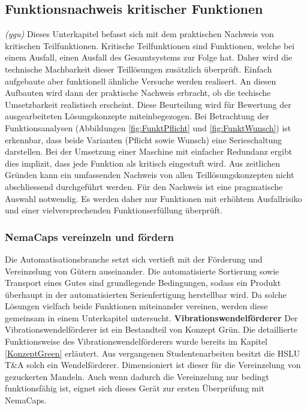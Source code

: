 \subsection{Funktionsnachweis kritischer Funktionen}
\label{funktionsnachweis}
\textit{(ygu)} Dieses Unterkapitel befasst sich mit dem praktischen Nachweis von kritischen Teilfunktionen. Kritische Teilfunktionen sind Funktionen, welche bei einem Ausfall, einen Ausfall des Gesamtsystems zur Folge hat. Daher wird die technische Machbarkeit dieser Teillösungen zusätzlich überprüft. Einfach aufgebaute aber funktionell ähnliche Versuche werden realisert. An diesen Aufbauten wird dann der praktische Nachweis erbracht, ob die techische Umsetzbarkeit realistisch erscheint. Diese Beurteilung wird für Bewertung der ausgearbeiteten Lösungskonzepte miteinbegezogen.
\newline
Bei Betrachtung der Funktionsanalysen (Abbildungen \ref{fig:FunktPflicht} und \ref{fig:FunktWunsch}) ist erkennbar, dass beide Varianten (Pflicht sowie Wunsch) eine Serieschaltung darstellen.  Bei der Umsetzung einer Maschine mit einfacher Redundanz ergibt dies implizit, dass jede Funktion als kritisch eingestuft wird. Aus zeitlichen Gründen kann ein umfassenden Nachweis von allen Teillösungskonzepten nicht abschliessend durchgeführt werden. Für den Nachweis ist eine pragmatische Auswahl notwendig. Es werden daher nur Funktionen mit erhöhtem Ausfallrisiko und einer vielversprechenden Funktionserfüllung überprüft.

\subsubsection{NemaCaps vereinzeln und fördern}
Die Automatisationsbranche setzt sich vertieft mit der Förderung und Vereinzelung von Gütern auseinander. Die automatisierte Sortierung sowie Transport eines Gutes sind grundlegende Bedingungen, sodass ein Produkt überhaupt in der automatisierten Serienfertigung herstellbar wird. Da solche Lösungen vielfach beide Funktionen miteinander vereinen, werden diese gemeinsam in einem Unterkapitel untersucht.
\newline
\newline
\textbf{Vibrationswendelförderer}
\newline
Der Vibrationswendelförderer ist ein Bestandteil von Konzept Grün. Die detaillierte Funktionsweise des Vibrationswendelförderers wurde bereits im Kapitel \ref{KonzeptGreen} erläutert.
\newline
Aus vergangenen Studentenarbeiten besitzt die HSLU T\&A solch ein Wendelförderer. Dimensioniert ist dieser für die Vereinzelung von gezuckerten Mandeln. Auch wenn dadurch die Vereinzelung nur bedingt funktionsfähig ist, eignet sich dieses Gerät zur ersten Überprüfung mit NemaCaps. 

